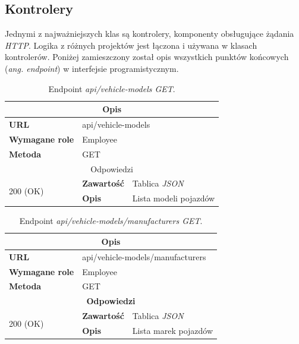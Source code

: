 \documentclass[eng,printmode,openany]{mgr}
\begin{document}
	\subsection{Kontrolery}
	Jednymi z najważniejszych klas są kontrolery, komponenty obsługujące żądania \textit{HTTP}. Logika z różnych projektów jest łączona i używana w klasach kontrolerów. 
	Poniżej zamieszczony został opis wszystkich punktów końcowych (\textit{ang. endpoint}) w interfejsie programistycznym.
	\begin{table}[H]
	\caption{Endpoint \textit{api/vehicle-models GET}.}
	\begin{tabularx}{\textwidth}{|l|l|X|}
		\hline
		\multicolumn{3}{|c|}{\textbf{\textbf{Opis}}}
		\\ \hline
		\textbf{URL}                         & \multicolumn{2}{l|}{api/vehicle-models}
		\\ \hline
		\textbf{Wymagane role}               & \multicolumn{2}{l|}{Employee}
		\\ \hline
		\textbf{Metoda}                      & \multicolumn{2}{l|}{GET}
		\\ \hline
		\multicolumn{3}{|c|}{ Odpowiedzi}
		\\ \hline
		\multirow{2}{*}{200 (OK)}   & \textbf{Zawartość}         & Tablica \textit{JSON}
		\\ \cline{2-3}              & \textbf{Opis}         	    & Lista modeli pojazdów
		\\ \hline
	\end{tabularx}
\end{table}

\begin{table}[H]
	\caption{Endpoint \textit{api/vehicle-models/manufacturers GET}.}
	\begin{tabularx}{\textwidth}{|l|l|X|}
		\hline
		\multicolumn{3}{|c|}{\textbf{\textbf{Opis}}}
		
		\\ \hline
		\textbf{URL}                         & \multicolumn{2}{l|}{api/vehicle-models/manufacturers}
		\\ \hline
		\textbf{Wymagane role}               & \multicolumn{2}{l|}{Employee}
		\\ \hline
		\textbf{Metoda}                      & \multicolumn{2}{l|}{GET}
		\\ \hline
		\multicolumn{3}{|c|}{\textbf{Odpowiedzi}}
		\\ \hline
		\multirow{2}{*}{200 (OK)}   & \textbf{Zawartość}        & Tablica \textit{JSON}
		\\ \cline{2-3}              & \textbf{Opis}         	   & Lista marek pojazdów
		\\ \hline
	\end{tabularx}
\end{table}
\end{document}
